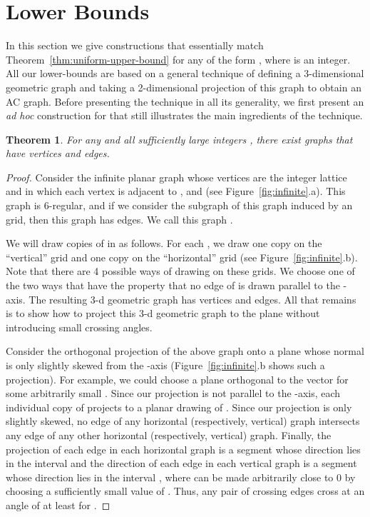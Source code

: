 \documentclass{patmorin}
\newcommand{\seclabel}[1]{\label{sec:#1}}
\newcommand{\figref}[1]{\mbox{Figure~\ref{fig:#1}}}
\newtheorem{thm}{Theorem}
\newcommand{\thmref}[1]{Theorem~\ref{thm:#1}}
\begin{document}
\section{Lower Bounds}
\seclabel{lower-bounds}

In this section we give constructions that essentially match
\thmref{uniform-upper-bound} for any  of the form
, where  is an integer.  All our
lower-bounds are based on a general technique of defining a 3-dimensional
geometric graph and taking a 2-dimensional projection of this graph
to obtain an AC graph.  Before presenting the technique in
all its generality, we first present an \emph{ad hoc} construction
for  that still illustrates the main ingredients of the
technique.

\begin{thm} \label{thm:LB_thm2}
For any  and all sufficiently large integers , there exist
 graphs that have  vertices and  edges.
\end{thm}

\begin{proof}
Consider the infinite planar graph whose vertices are the integer lattice
 and in which each vertex  is adjacent to ,
 and  (see \figref{infinite}.a).  This graph is
6-regular, and if we consider the subgraph of this graph induced by an
 grid, then this graph has  edges.  We call
this graph .

We will draw  copies of  in  as follows.
For each , we draw one copy on the ``vertical'' grid
 and one copy on the ``horizontal''
grid  (see
\figref{infinite}.b). Note that there are 4 possible ways of drawing  on these
 grids.  We choose one of the two ways that have the property
that no edge of  is drawn parallel to the -axis.
The resulting 3-d geometric graph has  vertices and  edges.  All that remains is to show how to
project this 3-d geometric graph to the plane without introducing small
crossing angles.

Consider the orthogonal projection of the above graph onto a plane whose
normal is only slightly skewed from the -axis (\figref{infinite}.b
shows such a projection).  For example, we could choose a plane orthogonal
to the vector  for some arbitrarily small .
Since our projection is not parallel to the -axis, each individual copy of
 projects to a planar drawing of .  
Since our projection
is only slightly skewed, no edge of any horizontal (respectively,
vertical) graph intersects any edge of any other horizontal (respectively,
vertical) graph.  Finally, the projection of each edge in each horizontal
graph is a segment whose direction lies in the interval 
and the direction of each edge in each vertical graph is a segment whose
direction lies in the interval , where
 can be made arbitrarily close to 0 by choosing a sufficiently
small value of .  Thus,
any pair of crossing edges cross at an angle of at least  for .
\end{proof}
\end{document}

